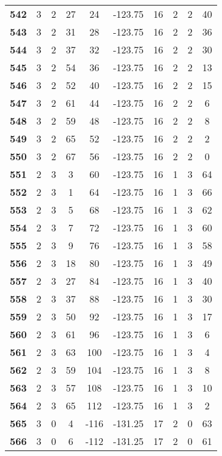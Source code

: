 \documentclass[12pt,letterpaper, onecolumn]{exam}
\begin{document}
\begin{longtable}{cccccccccc}
    \textbf{542} & 3 & 2 & 27 & 24 & -123.75 & 16 & 2 & 2 & 40 \\ 
    \textbf{543} & 3 & 2 & 31 & 28 & -123.75 & 16 & 2 & 2 & 36 \\ 
    \textbf{544} & 3 & 2 & 37 & 32 & -123.75 & 16 & 2 & 2 & 30 \\ 
    \textbf{545} & 3 & 2 & 54 & 36 & -123.75 & 16 & 2 & 2 & 13 \\ 
    \textbf{546} & 3 & 2 & 52 & 40 & -123.75 & 16 & 2 & 2 & 15 \\ 
    \textbf{547} & 3 & 2 & 61 & 44 & -123.75 & 16 & 2 & 2 & 6 \\ 
    \textbf{548} & 3 & 2 & 59 & 48 & -123.75 & 16 & 2 & 2 & 8 \\ 
    \textbf{549} & 3 & 2 & 65 & 52 & -123.75 & 16 & 2 & 2 & 2 \\ 
    \textbf{550} & 3 & 2 & 67 & 56 & -123.75 & 16 & 2 & 2 & 0 \\ 
    \textbf{551} & 2 & 3 & 3 & 60 & -123.75 & 16 & 1 & 3 & 64 \\ 
    \textbf{552} & 2 & 3 & 1 & 64 & -123.75 & 16 & 1 & 3 & 66 \\ 
    \textbf{553} & 2 & 3 & 5 & 68 & -123.75 & 16 & 1 & 3 & 62 \\ 
    \textbf{554} & 2 & 3 & 7 & 72 & -123.75 & 16 & 1 & 3 & 60 \\ 
    \textbf{555} & 2 & 3 & 9 & 76 & -123.75 & 16 & 1 & 3 & 58 \\ 
    \textbf{556} & 2 & 3 & 18 & 80 & -123.75 & 16 & 1 & 3 & 49 \\ 
    \textbf{557} & 2 & 3 & 27 & 84 & -123.75 & 16 & 1 & 3 & 40 \\ 
    \textbf{558} & 2 & 3 & 37 & 88 & -123.75 & 16 & 1 & 3 & 30 \\ 
    \textbf{559} & 2 & 3 & 50 & 92 & -123.75 & 16 & 1 & 3 & 17 \\ 
    \textbf{560} & 2 & 3 & 61 & 96 & -123.75 & 16 & 1 & 3 & 6 \\ 
    \textbf{561} & 2 & 3 & 63 & 100 & -123.75 & 16 & 1 & 3 & 4 \\ 
    \textbf{562} & 2 & 3 & 59 & 104 & -123.75 & 16 & 1 & 3 & 8 \\ 
    \textbf{563} & 2 & 3 & 57 & 108 & -123.75 & 16 & 1 & 3 & 10 \\ 
    \textbf{564} & 2 & 3 & 65 & 112 & -123.75 & 16 & 1 & 3 & 2 \\ 
    \textbf{565} & 3 & 0 & 4 & -116 & -131.25 & 17 & 2 & 0 & 63 \\      \hline
    \textbf{566} & 3 & 0 & 6 & -112 & -131.25 & 17 & 2 & 0 & 61 \\ 

\end{longtable}
\end{document}
